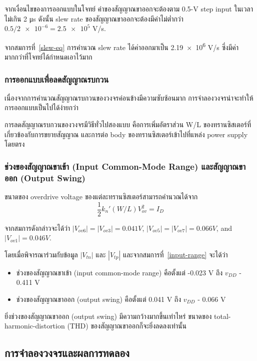\documentclass[a4paper, 11pt, oneside]{book} %
\begin{document}
จากเงื่อนไขของการออกแบบในโจทย์ ค่าของสัญญาณขาออกจะต้องตาม 0.5-V step input ในเวลาไม่เกิน 2 \si{\micro s} ดังนั้น slew rate ของสัญญาณขาออกจะต้องมีค่าไม่ต่ำกว่า $0.5/\num{2e-6} = \num{2.5e5}$ V/s.

จากสมการที่~\ref{slew-eq} การคำนวณ slew rate ได้ค่าออกมาเป็น \num{2.19e6} V/s ซึ่งมีค่ามากกว่าที่โจทย์ได้กำหนดเอาไว้มาก

\subsubsection{การออกแบบเพื่อลดสัญญาณรบกวน}

เนื่องจากการคำนวณสัญญาณรบกวนของวงจรค่อนข้างมีความซับซ้อนมาก การจำลองวงจรน่าจะทำให้การออกแบบเป็นไปได้ง่ายกว่า

การลดสัญญาณรบกวนของวงจรมีวิธีทั่วไปสองแบบ คือการเพิ่มอัตราส่วน W/L ของทรานซิสเตอร์ที่เกี่ยวข้องกับการขยายสัญญาณ และการต่อ body ของทรานซิสเตอร์เข้าไปที่แหล่ง power supply โดยตรง

\subsubsection{ช่วงของสัญญาณขาเข้า (Input Common-Mode Range) และสัญญาณขาออก  (Output Swing)}

ขนาดของ overdrive voltage ของแต่ละทรานซิสเตอร์สามารถคำนวณได้จาก
$$\frac{1}{2}k_n'(W/L)V_{ov}^2 = I_D$$

จากสมการดังกล่าวจะได้ว่า $|V_{ov6}| = |V_{ov3}| = 0.041 \si{V}$, $|V_{ov5}| = |V_{ov7}| = 0.066 \si{V}$, and $|V_{ov1}| = 0.046 \si{V}$.

โดยเมื่อพิจารณาร่วมกับข้อมูล $|V_{tn}|$ และ $|V_{tp}|$ และจากสมการที่~\ref{input-range} จะได้ว่า

\begin{itemize}
    \item ช่วงของสัญญาณขาเข้า (input common-mode range) คือตั้งแต่ -0.023 V ถึง $v_{DD}$ - 0.411 V
    \item ช่วงของสัญญาณขาออก (output swing) คือตั้งแต่ 0.041 V ถึง $v_{DD}$ - 0.066 V
\end{itemize}

ยิ่งช่วงของสัญญาณขาออก (output swing) มีความกว้างมากขึ้นเท่าไหร่ ขนาดของ total-harmonic-distortion (THD) ของสัญญาณขาออกก็จะยิ่งลดลงเท่านั้น

\subsection{การจำลองวงจรและผลการทดลอง}
\label{result-1}
\end{document}
